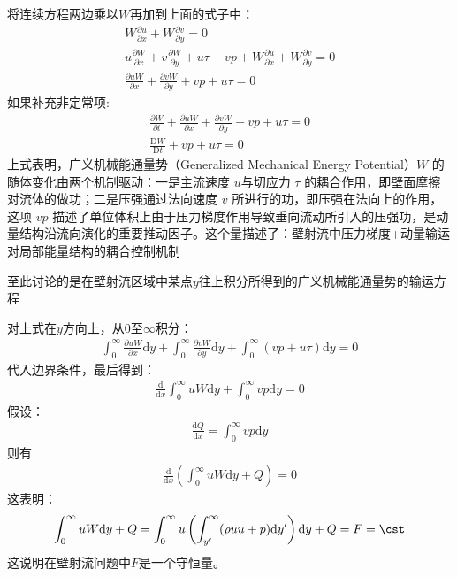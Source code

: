 将连续方程两边乘以$W$再加到上面的式子中：
\begin{align}
    W\frac{\partial u}{\partial x}+W\frac{\partial v}{\partial y}=0\\
    u\frac{\partial W}{\partial x}+v\frac{\partial W}{\partial y}+u\tau+vp+W\frac{\partial u}{\partial x}+W\frac{\partial v}{\partial y}=0\\
    \frac{\partial uW}{\partial x}+\frac{\partial vW}{\partial y}+vp+u\tau=0
\end{align}
如果补充非定常项:
\begin{align}
    \frac{\partial W}{\partial t}+\frac{\partial uW}{\partial x}+\frac{\partial vW}{\partial y}+vp+u\tau=0\\
    \frac{\mathrm{D}W}{\mathrm{D}t}+vp+u\tau=0
\end{align}
上式表明，广义机械能通量势（Generalized Mechanical Energy Potential）$W$ 的随体变化由两个机制驱动：一是主流速度 $u$与切应力 $\tau$ 的耦合作用，即壁面摩擦对流体的做功；二是压强通过法向速度 $v$ 所进行的功，即压强在法向上的作用，这项 $vp$ 描述了单位体积上由于压力梯度作用导致垂向流动所引入的压强功，是动量结构沿流向演化的重要推动因子。这个量描述了：壁射流中压力梯度+动量输运对局部能量结构的耦合控制机制

至此讨论的是在壁射流区域中某点$y$往上积分所得到的广义机械能通量势的输运方程

对上式在$y$方向上，从0至$\infty$积分：
\begin{align}
    \int_{0}^{\infty}\frac{\partial uW}{\partial x}\mathrm{d}y
    +\int_{0}^{\infty}\frac{\partial vW}{\partial y}\mathrm{d}y
    +\int_{0}^{\infty}(vp+u\tau)\mathrm{d}y=0
\end{align}
代入边界条件，最后得到：
\begin{align}
    \frac{\mathrm{d}}{\mathrm{d}x}\int_{0}^{\infty}uW\mathrm{d}y+\int_{0}^{\infty}vp\mathrm{d}y=0
\end{align}
假设：
\begin{align}
    \frac{\mathrm{d}Q}{\mathrm{d}x}=\int_{0}^{\infty}vp\mathrm{d}y
\end{align}
则有
\begin{align}
    \frac{\mathrm{d}}{\mathrm{d}x}\left(\int_{0}^{\infty}uW\mathrm{d}y+Q\right)=0
\end{align}
这表明：
\begin{align}
    \int_{0}^{\infty}uW\mathrm{d}y+Q=\int_{0}^{\infty}u\left(\int_{y'}^{\infty}(\rho uu+p)\mathrm{d}y'\right)\mathrm{d}y+Q=F=\cst
\end{align}
这说明在壁射流问题中$F$是一个守恒量。

